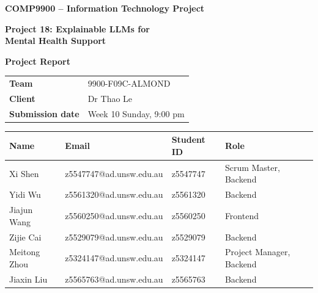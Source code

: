 \documentclass[11pt,a4paper]{article}
\begin{document}
\begin{titlepage}
  \thispagestyle{empty}

  \noindent\colorbox{UNSWGold}{\parbox[c][0.35cm][c]{\textwidth}{}}

  \vspace{1.3cm}
  {\Large\bfseries COMP9900 -- Information Technology Project\par}
  \vspace{0.5cm}
  {\huge\bfseries Project 18: Explainable LLMs for\\[0.2cm]
  Mental Health Support\par}
  \vspace{0.8cm}
  {\LARGE\color{Blue}\bfseries Project Report\par}

  \vspace{1.1cm}

  \begin{tabularx}{\textwidth}{@{}L{3.2cm}Y@{}}
    \textbf{Team} & 9900-F09C-ALMOND \\
    \textbf{Client} & Dr Thao Le \\
    \textbf{Submission date} & Week 10 Sunday, 9:00 pm \\
  \end{tabularx}

  \vspace{0.8cm}

  \begin{tabularx}{\textwidth}{@{}L{2.6cm}L{4.8cm}L{1.9cm}Y@{}}
    \toprule
    \textbf{Name} & \textbf{Email} & \textbf{Student ID} & \textbf{Role} \\
    \midrule
    Xi Shen & z5547747@ad.unsw.edu.au & z5547747 & Scrum Master, Backend \\
    Yidi Wu & z5561320@ad.unsw.edu.au & z5561320 & Backend \\
    Jiajun Wang & z5560250@ad.unsw.edu.au & z5560250 & Frontend \\
    Zijie Cai & z5529079@ad.unsw.edu.au & z5529079 & Backend \\
    Meitong Zhou & z5324147@ad.unsw.edu.au & z5324147 & Project Manager, Backend \\
    Jiaxin Liu & z5565763@ad.unsw.edu.au & z5565763 & Backend \\
    \bottomrule
  \end{tabularx}

  \vfill
\end{titlepage}
\end{document}
